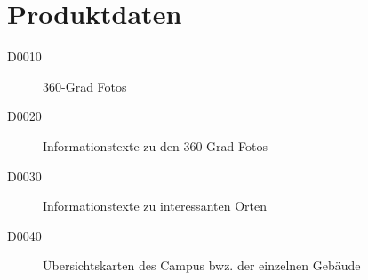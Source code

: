 \section{Produktdaten}
\label{sec:Produktdaten}

\begin{description}
  \item[D0010] 360-Grad Fotos
  \item[D0020] Informationstexte zu den 360-Grad Fotos
  \item[D0030] Informationstexte zu interessanten Orten
  \item[D0040] Übersichtskarten des Campus bwz. der einzelnen Gebäude
\end{description}